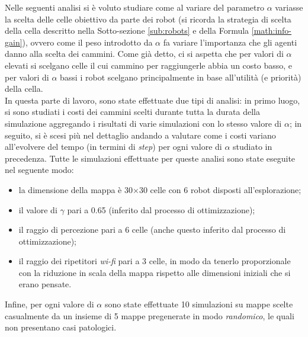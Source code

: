 Nelle seguenti analisi si è voluto studiare come al variare del parametro $\alpha$ variasse la scelta delle celle obiettivo da parte dei robot (si ricorda la strategia di scelta della cella descritto nella Sotto-sezione \ref{sub:robots} e della Formula \ref{math:info-gain}), ovvero come il peso introdotto da $\alpha$ fa variare l'importanza che gli agenti danno alla scelta dei cammini.
Come già detto, ci si aspetta che per valori di $\alpha$ elevati si scelgano celle il cui cammino per raggiungerle abbia un costo basso, e per valori di $\alpha$ bassi i robot scelgano principalmente in base all'utilità (e priorità) della cella.\\

In questa parte di lavoro, sono state effettuate due tipi di analisi: in primo luogo, si sono studiati i costi dei cammini scelti durante tutta la durata della simulazione aggregando i risultati di varie simulazioni con lo stesso valore di $\alpha$; in seguito, si è scesi più nel dettaglio andando a valutare come i costi variano all'evolvere del tempo (in termini di \textit{step}) per ogni valore di $\alpha$ studiato in precedenza.
Tutte le simulazioni effettuate per queste analisi sono state eseguite nel seguente modo:
\begin{itemize}
	\item la dimensione della mappa è 30$\times$30 celle con 6 robot disposti all'esplorazione;
	\item il valore di $\gamma$ pari a 0.65 (inferito dal processo di ottimizzazione);
	\item il raggio di percezione pari a 6 celle (anche questo inferito dal processo di ottimizzazione);
	\item il raggio dei ripetitori \textit{wi-fi} pari a 3 celle, in modo da tenerlo proporzionale con la riduzione in scala della mappa rispetto alle dimensioni iniziali che si erano pensate.
\end{itemize}
Infine, per ogni valore di $\alpha$ sono state effettuate 10 simulazioni su mappe scelte casualmente da un insieme di 5 mappe pregenerate in modo \textit{randomico}, le quali non presentano casi patologici.

